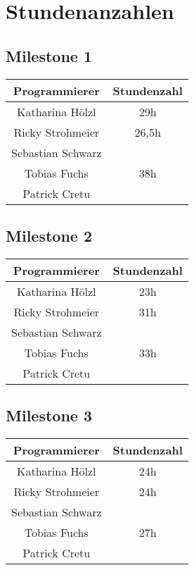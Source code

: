 \chapter{Stundenanzahlen}
\section{Milestone 1}
\begin{center}
	\begin{tabular}{|c|c|}
		\hline \textbf{Programmierer} & \textbf{Stundenzahl} \\ 
		\hline Katharina Hölzl  & 29h \\ 
		\hline Ricky Strohmeier & 26,5h \\ 
		\hline Sebastian Schwarz &  \\ 
		\hline Tobias Fuchs &  38h\\ 
		\hline Patrick Cretu &  \\ 
		\hline 
	\end{tabular}
\end{center} 
\section{Milestone 2}
\begin{center}
	\begin{tabular}{|c|c|}
		\hline \textbf{Programmierer} & \textbf{Stundenzahl} \\ 
		\hline Katharina Hölzl  & 23h  \\ 
		\hline Ricky Strohmeier & 31h\\ 
		\hline Sebastian Schwarz &  \\ 
		\hline Tobias Fuchs & 33h \\ 
		\hline Patrick Cretu &  \\ 
		\hline 
	\end{tabular}
\end{center} 
\section{Milestone 3}
\begin{center}
	\begin{tabular}{|c|c|}
		\hline \textbf{Programmierer} & \textbf{Stundenzahl} \\ 
		\hline Katharina Hölzl  & 24h \\ 
		\hline Ricky Strohmeier & 24h\\ 
		\hline Sebastian Schwarz &  \\ 
		\hline Tobias Fuchs &  27h\\ 
		\hline Patrick Cretu &  \\ 
		\hline 
	\end{tabular}
\end{center} 
